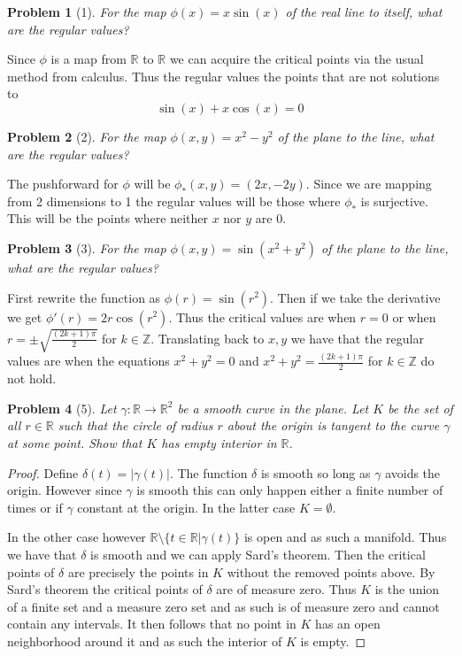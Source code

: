 \documentclass[10pt]{article}
\newcommand{\sk}{\vskip 10mm}
\newcommand{\bb}[1]{\mathbb{#1}}
\theoremstyle{plain}
\newtheorem{problem}{Problem}
\theoremstyle{remark}
\begin{document}
\begin{problem}[1]
  For the map $\phi(x)=x\sin(x)$ of the real line to itself,
  what are the regular values?
\end{problem}

Since $\phi$ is a map from $\bb{R}$ to $\bb{R}$ we can acquire
the critical points via the usual method from calculus.
Thus the regular values the points that are not solutions to
\[
  \sin(x)+x\cos(x) =0
\]

\sk

\begin{problem}[2]
  For the map $\phi(x,y)=x^2-y^2$ of the plane to the line, what
  are the regular values?
\end{problem}

The pushforward for $\phi$ will be $\phi_*(x,y)=(2x,-2y)$. Since we are
mapping from 2 dimensions to 1 the regular values will
be those where $\phi_*$ is surjective. This will be the points
where neither $x$ nor $y$ are 0.

\sk

\begin{problem}[3]
  For the map $\phi(x,y)=\sin(x^2+y^2)$ of the plane to the line,
  what are the regular values?
\end{problem}

First rewrite the function as $\phi(r)=\sin(r^2)$. Then if
we take the derivative we get $\phi'(r)=2r\cos(r^2)$. Thus
the critical values are when $r=0$ or when $r=\pm\sqrt{\frac{(2k+1)\pi}{2}}$
for $k\in \bb{Z}$. Translating back to $x,y$ we have that the
regular values are when the equations $x^2+y^2=0$ and
$x^2+y^2=\frac{(2k+1)\pi}{2}$ for $k\in \bb{Z}$ do not hold.

\sk

\begin{problem}[5]
  Let $\gamma:\bb{R}\rightarrow\bb{R}^2$ be a smooth curve in the plane.
  Let $K$ be the set of all $r\in \bb{R}$ such that the circle of
  radius $r$ about the origin is tangent to the curve $\gamma$ at
  some point. Show that $K$ has empty interior in $\bb{R}$.
\end{problem}

\begin{proof}
  Define $\delta(t)=|\gamma(t)|$. The function $\delta$ is smooth so long as
  $\gamma$ avoids the origin. However since $\gamma$ is smooth this can
  only happen either a finite number of times or if $\gamma$ constant
  at the origin. In the latter case $K=\emptyset$.

  In the other case however $\bb{R}\setminus\{t\in \bb{R}|\gamma(t)\}$ is open
  and as such a manifold. Thus we have that $\delta$ is smooth and
  we can apply Sard's theorem. Then the critical points of
  $\delta$ are precisely the points in $K$ without the removed points
  above. By Sard's theorem
  the critical points of $\delta$ are of measure zero. Thus
  $K$ is the union of a finite set and a measure zero set and as
  such is of measure zero and cannot contain any intervals. It
  then follows that no point in $K$ has an open neighborhood
  around it and as such the interior of $K$ is empty.
\end{proof}
\end{document}

